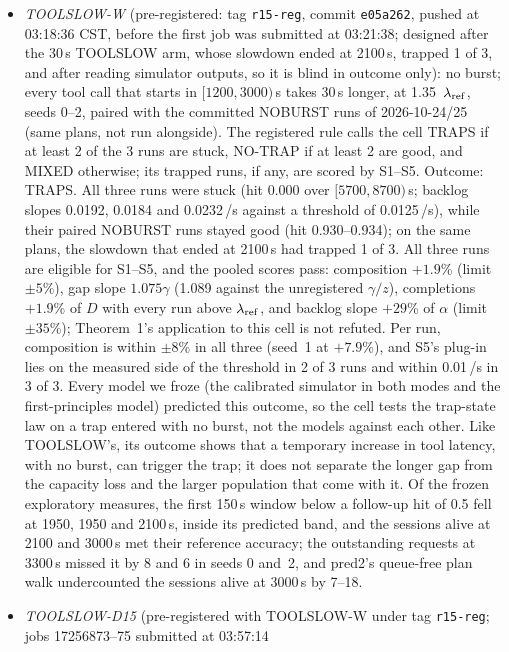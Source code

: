 \begin{itemize}[leftmargin=*,nosep]
\item \emph{TOOLSLOW-W} (pre-registered: tag \texttt{r15-reg}, commit \texttt{e05a262}, pushed at 03:18:36 CST, before the first job
was submitted at 03:21:38; designed after the 30\,s TOOLSLOW arm, whose slowdown ended at 2100\,s, trapped 1 of 3, and after
reading simulator outputs, so it is blind in outcome only): no burst; every tool call that starts in
$[1200,3000)$\,s takes 30\,s longer, at 1.35~$\lambda_{\mathrm{ref}}$, seeds 0--2, paired with the committed NOBURST runs of 2026-10-24/25 (same plans, not run alongside). The
registered rule calls the
cell TRAPS if at least 2 of the 3 runs are stuck, NO-TRAP if at least 2 are good, and MIXED otherwise; its trapped runs, if any, are
scored by S1--S5. Outcome: TRAPS. All three runs were stuck (hit 0.000 over $[5700,8700)$\,s; backlog slopes 0.0192, 0.0184
and 0.0232\,/s against a threshold of 0.0125\,/s), while their paired NOBURST runs stayed good (hit 0.930--0.934); on the same
plans, the slowdown that ended at 2100\,s had trapped 1 of 3. All three runs are eligible for S1--S5, and the pooled scores pass:
composition $+1.9$\% (limit $\pm5$\%), gap slope $1.075\gamma$ (1.089 against the unregistered $\gamma/z$), completions $+1.9$\% of
$D$ with every run above $\lambda_{\mathrm{ref}}$, and backlog slope $+29$\% of $\alpha$ (limit $\pm35$\%); Theorem~1's application to this cell is
not refuted. Per run, composition is within $\pm8$\% in all three (seed~1 at $+7.9$\%), and S5's plug-in lies on the measured side
of the threshold in 2 of 3 runs and within 0.01\,/s in 3 of 3. Every model we froze (the calibrated simulator in both modes and the
first-principles model) predicted this outcome, so the cell tests the trap-state law on a trap entered with no burst, not the models
against each other. Like TOOLSLOW's, its outcome shows that a temporary increase in tool latency, with no burst, can trigger the
trap; it does not separate the longer gap from the capacity loss and the larger population that come with it. Of the frozen
exploratory measures, the first 150\,s window below a follow-up hit of 0.5 fell at 1950, 1950 and 2100\,s, inside its predicted
band, and the sessions alive at 2100 and 3000\,s met their reference accuracy; the outstanding requests at 3300\,s missed it by 8 and
6 in seeds 0 and~2, and pred2's queue-free plan walk undercounted the sessions alive at 3000\,s by 7--18.
\item \emph{TOOLSLOW-D15} (pre-registered with TOOLSLOW-W under tag \texttt{r15-reg}; jobs 17256873--75 submitted at 03:57:14

\end{itemize}
